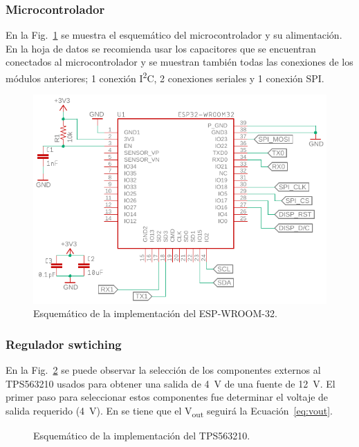 \subsubsection{Microcontrolador}
En la Fig.~\ref{fig:ESP_esquem} se muestra el esquemático del microcontrolador y su alimentación. En la hoja de datos \cite{Esp32_Hardware} se recomienda usar los capacitores que se encuentran conectados al microcontrolador y se muestran también todas las conexiones de los módulos anteriores; 1 conexión I\textsuperscript{2}C, 2 conexiones seriales y 1 conexión SPI.

\begin{figure}[hbtp!]
\centering
\includegraphics[width=\textwidth]{ESP32_esquem.pdf}
\caption{Esquemático de la implementación del ESP-WROOM-32.}
\label{fig:ESP_esquem}
\end{figure}


\subsubsection{Regulador swtiching}
En la Fig.~\ref{fig:esquem_switching} se puede observar la selección de los componentes externos al TPS563210 usados para obtener una salida de \SI{4}{V} de una fuente de \SI{12}{V}. El primer paso para seleccionar estos componentes fue determinar el voltaje de salida requerido (\SI{4}{V}). En \cite{TPS563210} se tiene que el V\textsubscript{out} seguirá la Ecuación~\ref{eq:vout}.
\begin{figure}[hbtp!]
\centering
{}%
\caption{Esquemático de la implementación del TPS563210.}
\label{fig:esquem_switching}
\end{figure}

